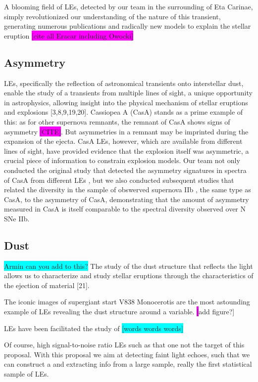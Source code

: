 \documentclass{proposalnsf}
\newcommand{\armin}[1]{\colorbox{cyan}{#1}}
\newcommand{\changeit}[1]{\colorbox{magenta}{#1}}
\begin{document}
A blooming field of LEs, detected by our team in the surrounding of Eta Carinae, simply revolutionized our understanding of the nature of this transient, generating numerous publications and radically new models to explain the stellar eruption \changeit{[cite all Eracar including Owocki]}

\subsection{Asymmetry}
LEs, specifically the reflection of astronomical transients onto interstellar dust, enable the study of a transients from multiple lines of sight, a unique opportunity in astrophysics, allowing insight into the physical mechanism of stellar eruptions and explosions [3,8,9,19,20].  Cassiopea A (CasA) stands as a prime example of this: as for other supernova remnants, the remnant of CasA shows signs of asymmetry \changeit{[CITE]}.  But asymmetries in a remnant may be imprinted during the expansion of the ejecta.  CasA LEs, however, which are available from different lines of sight, have provided evidence that the explosion itself was asymmetric, a crucial piece of information to constrain explosion models.  Our team not only conducted the original study that detected the asymmetry signatures in spectra of CasA from different LEs \tochange[RESTCASA], but we also conducted subsequent studies that related the diversity in the sample of obswerved supernova IIb \tochange[Finn], the same type as CasA, to the asymmetry of CasA, demonstrating that the amount of asymmetry measured in CasA is itself comparable to the spectral diversity observed over N SNe IIb.

\subsection{Dust}
\armin{Armin can you add to this?}
The study of the dust structure that reflects the light allows us to characterize and study stellar eruptions through the characteristics of the ejection of material [21].

The iconic images of supergiant start V838 Monocerotis are the most astounding example of LEs revealing the dust structure around a variable.
\changeit[add figure?]



LEs have been facilitated the study of \armin{[words words words]}

Of course, high signal-to-noise ratio LEs such as that one not the target of this proposal. With this proposal we aim at detecting faint light echoes, such that we can construct a and extracting info from a large sample, really the first statistical sample of LEs. 
\end{document}
